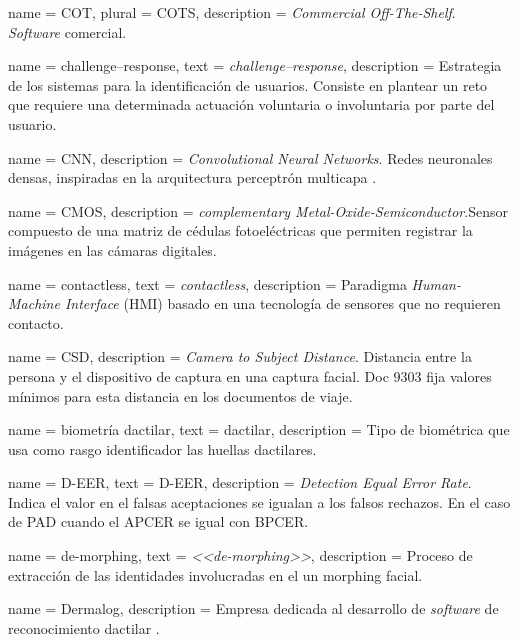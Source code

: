 {
    name        = {COT},
    plural      = {COTS},
    description = {\textit{Commercial Off-The-Shelf}. \textit{Software} comercial.}
}

{
    name        = {challenge–response},
    text        = \mbox{\textit{challenge–response}},
    description = {Estrategia de los sistemas para la identificación de usuarios. Consiste en plantear un reto que requiere una determinada actuación voluntaria o involuntaria por parte del usuario.}
}

{
    name        = {CNN},
    description = {\textit{Convolutional Neural Networks}. Redes neuronales densas, inspiradas en la arquitectura perceptrón multicapa \cite{goodfellow2016deep}.}
}

{
    name        = {CMOS},
    description = {\textit{complementary Metal-Oxide-Semiconductor}.Sensor compuesto de una matriz de cédulas fotoeléctricas que permiten registrar la imágenes en las cámaras digitales.}
}

{
    name        = {contactless},
    text        = {\textit{contactless}},
    description = {Paradigma \textit{Human-Machine Interface} (HMI) basado en una tecnología de sensores que no requieren contacto.}
}

{
    name        = {CSD},
    description = {\textit{Camera to Subject Distance}. Distancia entre la persona y el dispositivo de captura en una captura facial.  Doc $9303$ \cite{doc20069303} fija valores mínimos para esta distancia en los documentos de viaje.}
}

{
    name        = {biometría dactilar},
    text        = {dactilar},
    description = {Tipo de biométrica que usa como rasgo identificador las huellas dactilares.}
}

{
    name        = D-EER,
    text        = {\mbox{D-EER}},
    description = {\textit{Detection Equal Error Rate}. Indica el valor en el falsas aceptaciones se igualan a los falsos rechazos. En el caso de PAD cuando el APCER se igual con BPCER.}
}

{
    name        = {de-morphing},
    text        = \mbox{\textit{<<de-morphing>>}},
    description = {Proceso de extracción de las identidades involucradas en el un \gls{morphing} facial.}
}

{
    name        = {Dermalog},
    description = {Empresa dedicada al desarrollo de \textit{software} de reconocimiento dactilar \cite{DermalogOnline}.}
}

